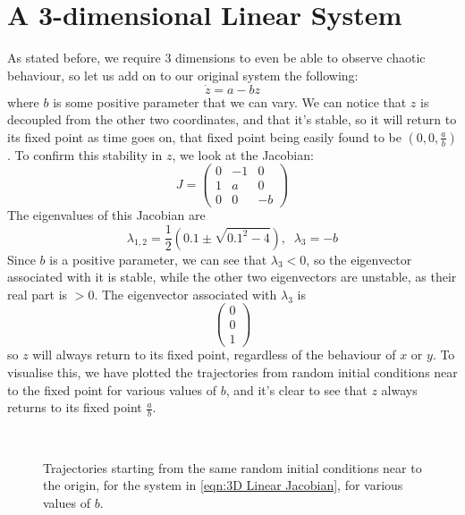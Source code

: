 \documentclass[12pt]{article}
\numberwithin{equation}{section}
\numberwithin{figure}{section}
\numberwithin{table}{section}
\begin{document}
    \section{A 3-dimensional Linear System}\label{sec:3D Linear}
    As stated before, we require 3 dimensions to even be able to observe chaotic behaviour, so 
    let us add on to our original system the following:
    \begin{equation*}
        \dot z=a-bz
    \end{equation*}
    where $b$ is some positive parameter that we can vary. We can notice that $z$ is decoupled 
    from the other two coordinates, and that it's stable, so it will return to its fixed point 
    as time goes on, that fixed point being easily found to be $(0,0,\frac{a}{b})$. To confirm 
    this stability in $z$, we look at the Jacobian:
    \begin{equation}
        J=
        \begin{pmatrix}
            0 & -1 & 0\\
            1 & a & 0\\
            0 & 0 & -b
        \end{pmatrix}
        \label{eqn:3D Linear Jacobian}
    \end{equation}
    The eigenvalues of this Jacobian are 
    \begin{equation*}
        \lambda_{1,2}=\frac{1}{2}(0.1\pm\sqrt{0.1^2-4}),\;\; \lambda_3=-b
    \end{equation*}
    Since $b$ is a positive parameter, we can see that $\lambda_3<0$, so the eigenvector 
    associated with it is stable, while the other two eigenvectors are unstable, as their 
    real part is $>0$. The eigenvector associated with $\lambda_3$ is 
    \begin{equation*}
        \begin{pmatrix}
            0\\0\\1
        \end{pmatrix}
    \end{equation*}
    so $z$ will always return to its fixed point, regardless of the behaviour of $x$ or $y$. 
    To visualise this, we have plotted the trajectories from random initial conditions near to 
    the fixed point for various values of $b$, and it's clear to see that $z$ always returns 
    to its fixed point $\frac{a}{b}$.
    \begin{figure}[H]%
        \centering
        \,
        \,
        \,
        \caption{Trajectories starting from the same random initial conditions near to the 
        origin, for the system in \autoref{eqn:3D Linear Jacobian}, for various values of $b$.}
        \label{fig:Q2}
    \end{figure}
\end{document}

